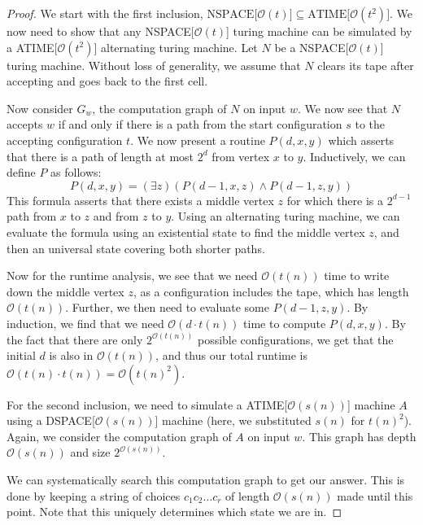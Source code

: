 \begin{proof}
    We start with the first inclusion, $\text{NSPACE[$\mathcal{O}(t)$]} \subseteq \text{ATIME[$\mathcal{O}(t^2)$]}$.
    We now need to show that any NSPACE[$\mathcal{O}(t)$] turing machine can be simulated by a ATIME[$\mathcal{O}(t^2)$] alternating turing machine.
    Let $N$ be a NSPACE[$\mathcal{O}(t)$] turing machine.
    Without loss of generality, we assume that $N$ clears its tape after accepting and goes back to the first cell.

    Now consider $G_w$, the computation graph of $N$ on input $w$.
    We now see that $N$ accepts $w$ if and only if there is a path from the start configuration $s$ to the accepting configuration $t$.
    We now present a routine $P(d, x, y)$ which asserts that there is a path of length at most $2^{d}$ from vertex $x$ to $y$.
    Inductively, we can define $P$ as follows:
    \[
        P(d, x, y) = (\exists z)(P(d - 1, x, z) \land P(d - 1, z, y))
    \]
    This formula asserts that there exists a middle vertex $z$ for which there is a $2^{d - 1}$ path from $x$ to $z$ and from $z$ to $y$.
    Using an alternating turing machine, we can evaluate the formula using an existential state to find the middle vertex $z$, and then an universal state covering both shorter paths.

    Now for the runtime analysis, we see that we need $\mathcal{O}(t(n))$ time to write down the middle vertex $z$, as a configuration includes the tape, which has length $\mathcal{O}(t(n))$.
    Further, we then need to evaluate some $P(d - 1, z, y)$.
    By induction, we find that we need $\mathcal{O}(d\cdot t(n))$ time to compute $P(d, x, y)$.
    By the fact that there are only $2^{\mathcal{O}(t(n))}$ possible configurations, we get that the initial $d$ is also in $\mathcal{O}(t(n))$, and thus our total runtime is $\mathcal{O}(t(n)\cdot t(n)) = \mathcal{O}(t(n)^2)$.

    For the second inclusion, we need to simulate a ATIME[$\mathcal{O}(s(n))$] machine $A$ using a DSPACE[$\mathcal{O}(s(n))$] machine (here, we substituted $s(n)$ for $t(n)^2$).
    Again, we consider the computation graph of $A$ on input $w$.
    This graph has depth $\mathcal{O}(s(n))$ and size $2^{\mathcal{O}(s(n))}$.

    We can systematically search this computation graph to get our answer.
    This is done by keeping a string of choices $c_{1}c_{2}\dots c_r$ of length $\mathcal{O}(s(n))$ made until this point.
    Note that this uniquely determines which state we are in.


\end{proof}
